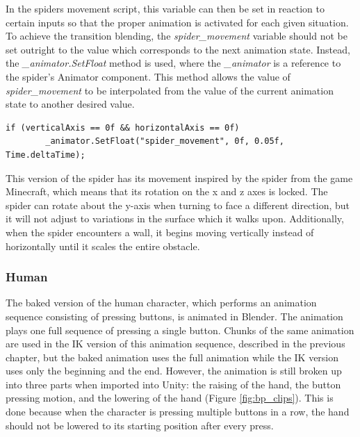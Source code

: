 In the spiders movement script, this variable can then be set in reaction to
certain inputs so that the proper animation is activated for each given situation.
To achieve the transition blending, the \textit{spider\_movement} variable
should not be set outright to the value which corresponds to the next animation
state. Instead, the \textit{\_animator.SetFloat} method is used, where the
\textit{\_animator} is a reference to the spider's Animator component. This
method allows the value of \textit{spider\_movement} to be interpolated from the value of
the current animation state to another desired value.
\newline
\begin{lstlisting}[basicstyle=\footnotesize, numbers=none,frame=single,
caption={Transitioning to the spider's idle animation using the
\textit{SetFloat} method},captionpos=b, label=stretch, language={[Sharp]c}]
    if (verticalAxis == 0f && horizontalAxis == 0f)
        _animator.SetFloat("spider_movement", 0f, 0.05f, Time.deltaTime);
\end{lstlisting}

This version of the spider has its movement inspired by the spider from the game
Minecraft, which means that its rotation on the x and z axes is locked. The
spider can rotate about the y-axis when turning to face a different direction,
but it will not adjust to variations in the surface which it walks upon.
Additionally, when the spider encounters a wall, it begins moving
vertically instead of horizontally until it scales the entire obstacle.

\subsubsection{Human}
The baked version of the human character, which performs an animation sequence
consisting of pressing buttons, is animated in Blender. The animation plays one
full sequence of pressing a single button. Chunks of the same animation are used
in the IK version of this animation sequence, described in the previous chapter,
but the baked animation uses the full animation while the IK version uses only
the beginning and the end. However, the animation is still broken up into three
parts when imported into Unity: the raising of the hand, the button pressing
motion, and the lowering of the hand (Figure \ref{fig:bp_clips}). This is done
because when the character is pressing multiple buttons in a row, the hand
should not be lowered to its starting position after every press.

